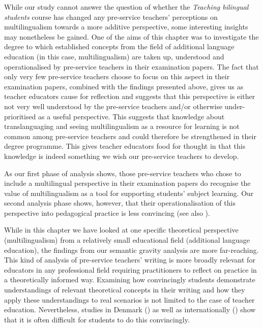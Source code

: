 \documentclass[output=paper]{langscibook}
\begin{document}
While our study cannot answer the question of whether the \textit{Teaching bilingual students} course has changed any pre-service teachers’ perceptions on multilingualism towards a more additive perspective, some interesting insights may nonetheless be gained. One of the aims of this chapter was to investigate the degree to which established concepts from the field of additional language education (in this case, multilingualism) are taken up, understood and operationalised by pre-service teachers in their examination papers. The fact that only very few pre-service teachers choose to focus on this aspect in their examination papers, combined with the findings presented above, gives us as teacher educators cause for reflection and suggests that this perspective is either not very well understood by the pre-service teachers and/or otherwise under-prioritised as a useful perspective. This suggests that knowledge about translanguaging and seeing multilingualism as a resource for learning is not common among pre-service teachers and could therefore be strengthened in their degree programme. This gives teacher educators food for thought in that this knowledge is indeed something we wish our pre-service teachers to develop.

As our first phase of analysis shows, those pre-service teachers who chose to include a multilingual perspective in their examination papers do recognise the value of multilingualism as a tool for supporting students’ subject learning. Our second analysis phase shows, however, that their operationalisation of this perspective into pedagogical practice is less convincing (see also \citealt{chapters/7_alisaari, chapters/8_heikkola, chapters/6_iversen}).

While in this chapter we have looked at one specific theoretical perspective (multilingualism) from a relatively small educational field (additional language education), the findings from our semantic gravity analysis are more far\hyp reaching. This kind of analysis of pre-service teachers’ writing is more broadly relevant for educators in any professional field requiring practitioners to reflect on practice in a theoretically informed way. Examining how convincingly students demonstrate understandings of relevant theoretical concepts in their writing and how they apply these understandings to real scenarios is not limited to the case of teacher education. Nevertheless, studies in Denmark (\citealt{NielsenPaulsen2006}) as well as internationally (\citealt{Calderhead1987,LeCornuEwing2008,Rusznyak2021}) show that it is often difficult for students to do this convincingly.
\end{document}
